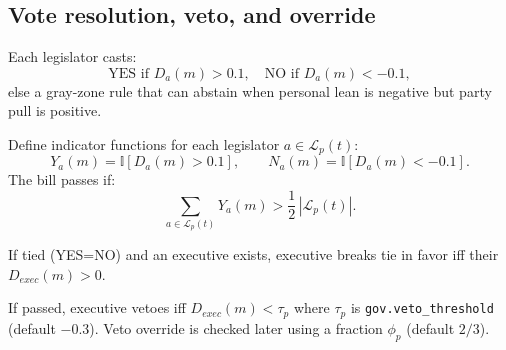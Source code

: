 \documentclass[11pt]{article}
\begin{document}
\subsection{Vote resolution, veto, and override}
Each legislator casts:
\[
  \text{YES if } D_a(m) > 0.1,\quad
  \text{NO if } D_a(m) < -0.1,
\]
else a gray-zone rule that can abstain when personal lean is negative but party pull is positive.

Define indicator functions for each legislator $a \in \mathcal{L}_p(t)$:
\[
  Y_a(m) = \mathbb{I}[D_a(m) > 0.1], \qquad
  N_a(m) = \mathbb{I}[D_a(m) < -0.1].
\]
The bill passes if:
\[
  \sum_{a \in \mathcal{L}_p(t)} Y_a(m) > \frac{1}{2}\,|\mathcal{L}_p(t)|.
\]

If tied (YES=NO) and an executive exists, executive breaks tie in favor iff their $D_{exec}(m)>0$.

If passed, executive vetoes iff $D_{exec}(m) < \tau_p$ where $\tau_p$ is \texttt{gov.veto\_threshold}
(default $-0.3$). Veto override is checked later using a fraction $\phi_p$ (default $2/3$).

\begin{center}
\end{center}
\end{document}
